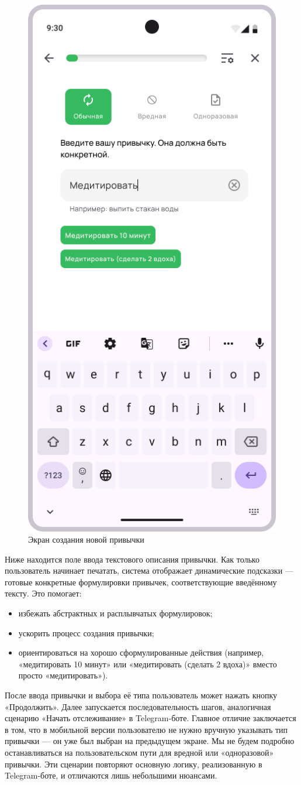 \documentclass[pdflatex,sn-mathphys-num]{sn-jnl}%
\theoremstyle{thmstyleone}%
\theoremstyle{thmstyletwo}%
\theoremstyle{thmstylethree}%
\begin{document}
\begin{figure}
    \centering
    \includegraphics[width=0.5\linewidth]{figures/App/Habits_add_1_1.png}
    \caption{Экран создания новой привычки}
    \label{fig:Habits_add_1_1}
\end{figure}

Ниже находится поле ввода текстового описания привычки. Как только пользователь начинает печатать, система отображает динамические подсказки — готовые конкретные формулировки привычек, соответствующие введённому тексту. Это помогает:

\begin{itemize}
    \item избежать абстрактных и расплывчатых формулировок;
    \item ускорить процесс создания привычки;
    \item ориентироваться на хорошо сформулированные действия (например, «медитировать 10 минут» или «медитировать (сделать 2 вдоха)» вместо просто «медитировать»).
\end{itemize}

После ввода привычки и выбора её типа пользователь может нажать кнопку «Продолжить». Далее запускается последовательность шагов, аналогичная сценарию «Начать отслеживание» в Telegram-боте. Главное отличие заключается в том, что в мобильной версии пользователю не нужно вручную указывать тип привычки — он уже был выбран на предыдущем экране. Мы не будем подробно останавливаться на пользовательском пути для вредной или «одноразовой» привычки. Эти сценарии повторяют основную логику, реализованную в Telegram-боте, и отличаются лишь небольшими нюансами.
\end{document}
